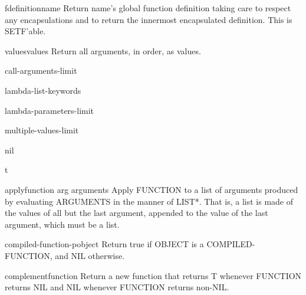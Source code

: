 \documentclass[10pt,english]{book}
\begin{document}
\begin{accessor}{fdefinition}{name}
  Return name's global function definition taking care to respect any
   encapsulations and to return the innermost encapsulated definition.
   This is SETF'able.
\end{accessor}

\begin{accessor}{values}{\rest values}
  Return all arguments, in order, as values.
\end{accessor}

\begin{constant}{call-arguments-limit}{}
  
\end{constant}

\begin{constant}{lambda-list-keywords}{}
  
\end{constant}

\begin{constant}{lambda-parameters-limit}{}
  
\end{constant}

\begin{constant}{multiple-values-limit}{}
  
\end{constant}

\begin{constant}{nil}{}
  
\end{constant}

\begin{constant}{t}{}
  
\end{constant}

\begin{function}{apply}{function arg \rest arguments}
  Apply FUNCTION to a list of arguments produced by evaluating ARGUMENTS in
  the manner of LIST*. That is, a list is made of the values of all but the
  last argument, appended to the value of the last argument, which must be a
  list.
\end{function}

\begin{function}{compiled-function-p}{object}
  Return true if OBJECT is a COMPILED-FUNCTION, and NIL otherwise.
\end{function}

\begin{function}{complement}{function}
  Return a new function that returns T whenever FUNCTION returns NIL and
   NIL whenever FUNCTION returns non-NIL.
\end{function}
\end{document}
